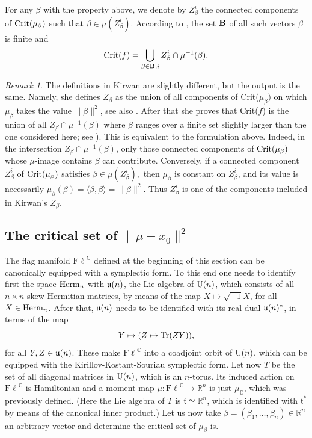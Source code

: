 \documentclass[12pt]{amsart}
\theoremstyle{definition}
\theoremstyle{remark}
\newtheorem{rem}[thm]{Remark}
\newcommand{\RR}{\mathbb R}
\newcommand{\CC}{\mathbb C}
\newcommand{\Fl}{{\mathrm{F\ell}}}
\begin{document}
	For any $\beta$ with the property above, we denote by $Z_\beta^i$ the  connected components of ${\rm Crit}(\mu_\beta)$ such that
	$\beta \in \mu(Z_\beta^i)$.
	 According to \cite[Lemma 3.12]{Ki}, the set ${\bf B}$ of all such vectors $\beta$  is finite and $${\rm Crit}(f)= \bigcup_{\beta \in {\bf B}, i} Z_\beta^i \cap \mu^{-1}(\beta).$$

\begin{rem} The definitions in Kirwan \cite{Ki} are slightly different, but the output is the same. Namely, she defines $Z_\beta$ as the union of all components of Crit($ \mu_\beta)$ on which $\mu_\beta$ takes the value $\|\beta\|^2$, see also \cite[Sect.~3.1]{BaHe}. After that she proves that Crit($f$) is the union of all $Z_\beta \cap \mu^{-1}(\beta)$ where $\beta$ ranges over a finite set slightly larger than the one considered here; see  \cite[Lemma 3.15]{Ki}). This is equivalent to the formulation above. Indeed, in the intersection $Z_\beta\cap\mu^{-1}(\beta)$, only those connected components of ${\rm Crit}(\mu_\beta)$ whose $\mu$-image contains $\beta$ can contribute. Conversely, if a connected component $Z_\beta^i$ of ${\rm Crit}(\mu_\beta)$ satisfies
$
\beta\in\mu(Z_\beta^i),
$
then $\mu_\beta$ is constant on $Z_\beta^i$, and its value is necessarily
$
\mu_\beta(\beta)=\langle\beta,\beta\rangle=\|\beta\|^2.
$
Thus $Z_\beta^i$ is one of the components included in Kirwan's $Z_\beta$.
\end{rem}



\subsection{The critical set of $\|\mu -x_0\|^2$} \label{sect:critmu}

The flag manifold $\Fl^\CC$ defined at the beginning of this section can be canonically equipped with a symplectic form. To this end one needs to identify 
first the space ${\rm Herm}_n$ with ${\frak u}(n)$, the Lie algebra of ${\rm U}(n)$, which consists of all $n\times n$ 
skew-Hermitian matrices, by means of the map $X\mapsto \sqrt{-1}X$, for all $X\in {\rm Herm}_n$. After that, ${\frak u}(n)$ needs to be identified with its real dual
${\frak u}(n)^*$, in terms of the map 
$$Y \mapsto (Z \mapsto {\rm Tr}(ZY)),$$
for all $Y, Z\in {\frak u}(n)$.  These make $\Fl^\CC$ into a coadjoint orbit of ${\rm U}(n)$, which can be equipped with the Kirillov-Kostant-Souriau symplectic form.
 Let now $T$ be the set of all diagonal matrices in ${\rm U}(n)$, which is an $n$-torus. 
Its induced action on $\Fl^\CC$ is Hamiltonian and a moment map $\mu: \Fl^\CC \to \RR^n$ is just 
$\mu_\CC$,  which was previously defined.  
(Here the Lie algebra of $T$ is ${\mathfrak t}\simeq {\mathbb R}^n$, which is identified with ${\mathfrak t}^*$ by means of the canonical inner product.) Let us now take $\beta =(\beta_1, \ldots, \beta_n) \in \RR^n$ an  arbitrary vector and determine the critical set of $\mu_\beta$ is.
\end{document}
